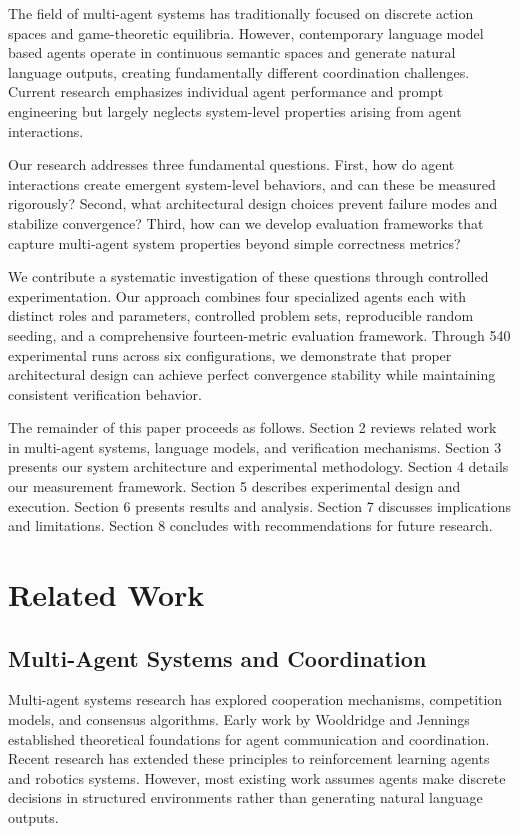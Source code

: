 \documentclass[conference]{IEEEtran}
\begin{document}
The field of multi-agent systems has traditionally focused on discrete action spaces and game-theoretic equilibria. However, contemporary language model based agents operate in continuous semantic spaces and generate natural language outputs, creating fundamentally different coordination challenges. Current research emphasizes individual agent performance and prompt engineering but largely neglects system-level properties arising from agent interactions.

Our research addresses three fundamental questions. First, how do agent interactions create emergent system-level behaviors, and can these be measured rigorously? Second, what architectural design choices prevent failure modes and stabilize convergence? Third, how can we develop evaluation frameworks that capture multi-agent system properties beyond simple correctness metrics?

We contribute a systematic investigation of these questions through controlled experimentation. Our approach combines four specialized agents each with distinct roles and parameters, controlled problem sets, reproducible random seeding, and a comprehensive fourteen-metric evaluation framework. Through 540 experimental runs across six configurations, we demonstrate that proper architectural design can achieve perfect convergence stability while maintaining consistent verification behavior.

The remainder of this paper proceeds as follows. Section 2 reviews related work in multi-agent systems, language models, and verification mechanisms. Section 3 presents our system architecture and experimental methodology. Section 4 details our measurement framework. Section 5 describes experimental design and execution. Section 6 presents results and analysis. Section 7 discusses implications and limitations. Section 8 concludes with recommendations for future research.

\section{Related Work}

\subsection{Multi-Agent Systems and Coordination}

Multi-agent systems research has explored cooperation mechanisms, competition models, and consensus algorithms. Early work by Wooldridge and Jennings established theoretical foundations for agent communication and coordination. Recent research has extended these principles to reinforcement learning agents and robotics systems. However, most existing work assumes agents make discrete decisions in structured environments rather than generating natural language outputs.
\end{document}

